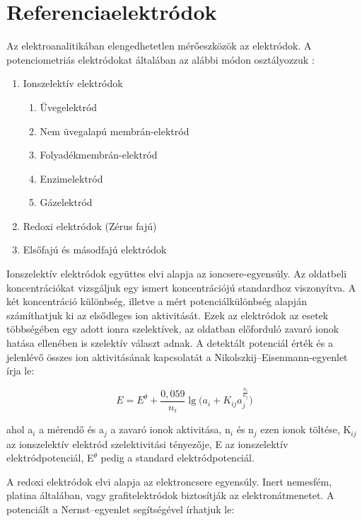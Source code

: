 \section{Referenciaelektródok}

Az elektroanalitikában elengedhetetlen mérőeszközök az elektródok. A potenciometriás elektródokat általában az alábbi módon osztályozzuk \cite{kalman2002az}:

\begin{enumerate}  
    \item Ionszelektív elektródok
      \begin{enumerate}
	\item Üvegelektród
	\item Nem üvegalapú membrán-elektród
	\item Folyadékmembrán-elektród
	\item Enzimelektród
	\item Gázelektród
	\end{enumerate}
    \item Redoxi elektródok (Zérus fajú)
    \item Elsőfajú és másodfajú elektródok
\end{enumerate}

Ionszelektív elektródok együttes elvi alapja az ioncsere-egyensúly. Az oldatbeli koncentrációkat vizsgáljuk egy ismert koncentrációjú standardhoz viszonyítva. A két koncentráció különbség, illetve a mért potenciálkülönbség alapján számíthatjuk ki az elsődleges ion aktivitását. Ezek az elektródok az esetek többségében egy adott ionra szelektívek, az oldatban előforduló zavaró ionok hatása ellenében is szelektív választ adnak. A detektált potenciál érték és a jelenlévő összes ion aktivitásának kapcsolatát a Nikolszkij--Eisenmann-egyenlet írja le:

\begin{equation}
E = E^\theta + \frac{0,059}{n_i}\lg \Big (a_i + K_{ij} a_j^\frac{n_i}{n_j} \Big )
\label{eq:nikolszkij}
\end{equation}

ahol a$_i$  a mérendő és a$_j$ a zavaró ionok aktivitása, n$_i$ és n$_j$ ezen ionok töltése, K$_{ij}$ az ionszelektív elektród szelektivitási tényezője, E az ionszelektív elektródpotenciál, E$^\theta$ pedig a standard elektródpotenciál.

A redoxi elektródok elvi alapja az elektroncsere egyensúly. Inert nemesfém, platina általában, vagy grafitelektródok biztosítják az elektronátmenetet. A potenciált a Nernst--egyenlet segítségével írhatjuk le:

